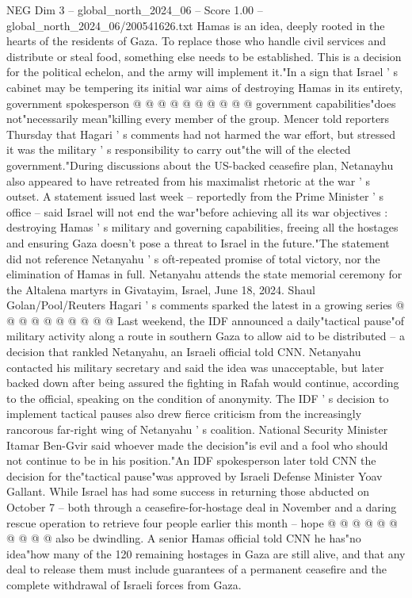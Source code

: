 \begin{textsample}{NEG Dim 3 – global\_north\_2024\_06 – Score 1.00 – global\_north\_2024\_06/200541626.txt}
Hamas is an idea, deeply rooted in the hearts of the residents of Gaza.
To replace those who handle civil services and distribute or steal food, something else needs to be established.
This is a decision for the political echelon, and the army will implement it."In a sign that Israel ' s cabinet may be tempering its initial war aims of destroying Hamas in its entirety, government spokesperson @ @ @ @ @ @ @ @ @ @ government capabilities"does not"necessarily mean"killing every member of the group.
Mencer told reporters Thursday that Hagari ' s comments had not harmed the war effort, but stressed it was the military ' s responsibility to carry out"the will of the elected government."During discussions about the US-backed ceasefire plan, Netanayhu also appeared to have retreated from his maximalist rhetoric at the war ' s outset.
A statement issued last week -- reportedly from the Prime Minister ' s office -- said Israel will not end the war"before achieving all its war objectives : destroying Hamas ' s military and governing capabilities, freeing all the hostages and ensuring Gaza doesn't pose a threat to Israel in the future."The statement did not reference Netanyahu ' s oft-repeated promise of total victory, nor the elimination of Hamas in full.
Netanyahu attends the state memorial ceremony for the Altalena martyrs in Givatayim, Israel, June 18, 2024.
Shaul Golan/Pool/Reuters Hagari ' s comments sparked the latest in a growing series @ @ @ @ @ @ @ @ @ @ Last weekend, the IDF announced a daily"tactical pause"of military activity along a route in southern Gaza to allow aid to be distributed -- a decision that rankled Netanyahu, an Israeli official told CNN.
Netanyahu contacted his military secretary and said the idea was unacceptable, but later backed down after being assured the fighting in Rafah would continue, according to the official, speaking on the condition of anonymity.
The IDF ' s decision to implement tactical pauses also drew fierce criticism from the increasingly rancorous far-right wing of Netanyahu ' s coalition.
National Security Minister Itamar Ben-Gvir said whoever made the decision"is evil and a fool who should not continue to be in his position."An IDF spokesperson later told CNN the decision for the"tactical pause"was approved by Israeli Defense Minister Yoav Gallant.
While Israel has had some success in returning those abducted on October 7 -- both through a ceasefire-for-hostage deal in November and a daring rescue operation to retrieve four people earlier this month -- hope @ @ @ @ @ @ @ @ @ @ also be dwindling.
A senior Hamas official told CNN he has"no idea"how many of the 120 remaining hostages in Gaza are still alive, and that any deal to release them must include guarantees of a permanent ceasefire and the complete withdrawal of Israeli forces from Gaza.

\end{textsample}
